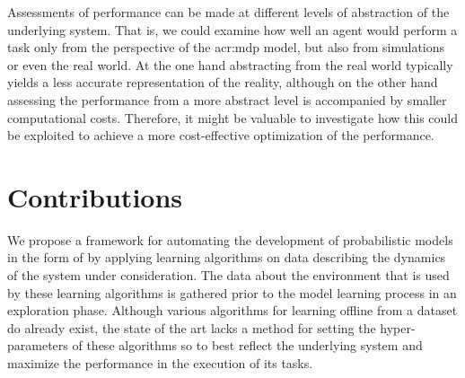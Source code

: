 Assessments of performance can be made at different levels of abstraction of the underlying system.
That is, we could examine how well an agent would perform a task only from the perspective of the \acrshort{acr:mdp} model, but also
from simulations or even the real world.
At the one hand abstracting from the real world typically yields a less accurate representation of the reality, although on the other hand assessing the performance from a more abstract level is accompanied by smaller computational costs.
Therefore, it might be valuable to investigate how this could be exploited to achieve a more cost-effective optimization of the performance.


\section{Contributions}
\label{sec:contribution}

We propose a framework for automating the development of probabilistic models in the form of  by applying learning algorithms on data describing the dynamics of the system under consideration.
The data about the environment that is used by these learning algorithms is gathered prior to the model learning process in an exploration phase.
Although various algorithms for learning  offline from a dataset \cite{shatkay1997learning, welch2003hidden, nikovski2002state} do already exist, the state of the art lacks a method for setting the hyper-parameters of these algorithms so to best reflect the underlying system and maximize the performance in the execution of its tasks.

